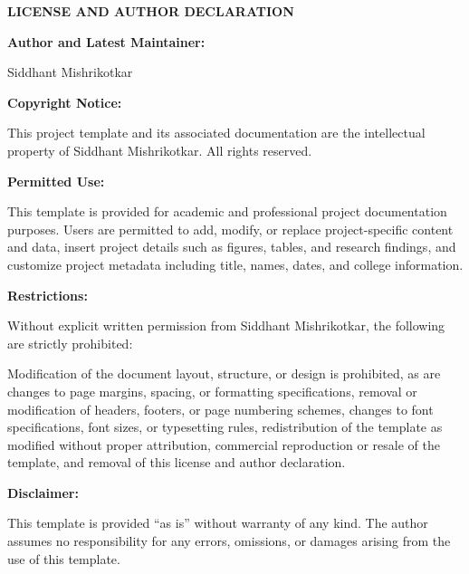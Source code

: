 \thispagestyle{empty}

\vspace*{2\baselineskip}

\begin{center}
\textbf{\fontsize{12}{14}\selectfont LICENSE AND AUTHOR DECLARATION}
\end{center}

\vspace{2\baselineskip}

\noindent \textbf{Author and Latest Maintainer:}

Siddhant Mishrikotkar

\vspace{1.5\baselineskip}

\noindent \textbf{Copyright Notice:}

This project template and its associated documentation are the intellectual property of Siddhant Mishrikotkar. All rights reserved.

\vspace{1.5\baselineskip}

\noindent \textbf{Permitted Use:}

This template is provided for academic and professional project documentation purposes. Users are permitted to add, modify, or replace project-specific content and data, insert project details such as figures, tables, and research findings, and customize project metadata including title, names, dates, and college information.

\vspace{1.5\baselineskip}

\noindent \textbf{Restrictions:}

Without explicit written permission from Siddhant Mishrikotkar, the following are strictly prohibited:

Modification of the document layout, structure, or design is prohibited, as are changes to page margins, spacing, or formatting specifications, removal or modification of headers, footers, or page numbering schemes, changes to font specifications, font sizes, or typesetting rules, redistribution of the template as modified without proper attribution, commercial reproduction or resale of the template, and removal of this license and author declaration.

\vspace{1.5\baselineskip}

\noindent \textbf{Disclaimer:}

This template is provided ``as is'' without warranty of any kind. The author assumes no responsibility for any errors, omissions, or damages arising from the use of this template.

